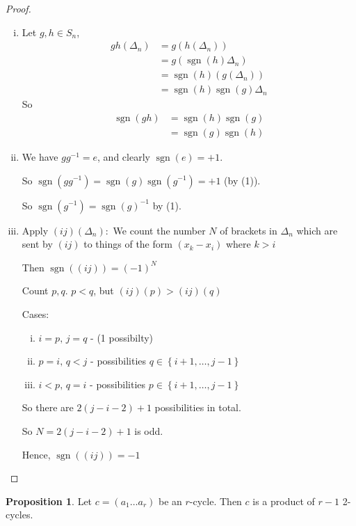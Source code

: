 \documentclass{article}
\theoremstyle{definition} \newtheorem*{definition}{Definition}
\newtheorem{proposition}[theorem]{Proposition}
\newcommand{\dtn}{\Delta_n} \newcommand{\gene}[1]{\langle #1 \rangle}
\DeclareMathOperator{\sgn}{sgn} \DeclareMathOperator{\id}{id}
\begin{document}
\begin{proof}\hfill \begin{enumerate}[(i)] \item Let $g,h \in S_n$, \begin{align*}
              gh(\dtn) &= g(h(\dtn)) \\ &= g(\sgn(h)\dtn) \\ &=
              \sgn(h)(g(\dtn)) \\ &= \sgn(h) \sgn(g) \dtn \end{align*} So
            \begin{align*} \sgn(gh) &= \sgn(h)\sgn(g) \\ &= \sgn(g)\sgn(h)
            \end{align*}

    \item We have $g g^{-1}=e$, and clearly $\sgn(e) = +1$. 

      So $\sgn(g g^{-1})=\sgn(g)\sgn(g^{-1})=+1$ (by (1)).

      So $\sgn(g^{-1})=\sgn(g)^{-1}$ by (1).

    \item Apply $(ij)(\dtn):$ We count the number $N$ of brackets in $\dtn$
      which are sent by $(ij)$ to things of the form $(x_k - x_i)$ where $k>i$ 

      Then $\sgn\left( (ij) \right)=(-1)^N$

      Count $p,q$. $p<q$, but $(ij)(p)>(ij)(q)$

      Cases: \begin{enumerate}[(i)] \item $i=p,\, j=q$ - (1 possibilty) \item
          $p=i,\,q<j$ - possibilities $q \in \left\{ i+1, \ldots, j-1 \right\}$
        \item $i<p,\,q=i$ - possibilities $p \in \left\{ i+1, \ldots , j-1
          \right\}$ \end{enumerate} So there are $2(j-i-2) +1$ possibilities in
      total.

      So $N=2(j-i-2)+1$ is odd. 

      Hence, $\sgn\left( (ij) \right)=-1$ \end{enumerate} \end{proof}

\begin{proposition} \label{prp:2cycles} Let $c=(a_1 \ldots a_r)$ be an
  $r$-cycle. Then $c$ is a product of $r-1$ 2-cycles.  \end{proposition}
\end{document}
